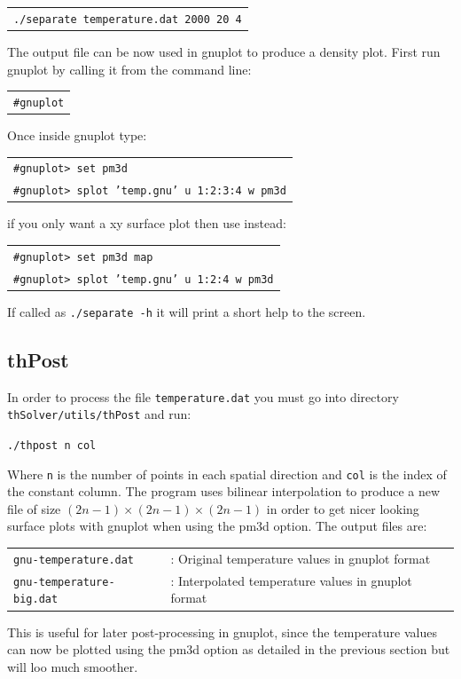\documentclass[12pt]{article}
\begin{document}
\begin{tabular}{l}
\texttt{./separate temperature.dat 2000 20 4}
\end{tabular}

The output file can be now used in gnuplot to produce a density plot. First run gnuplot by calling it from the command line:

\begin{tabular}{l}
\verb+#gnuplot+
\end{tabular}

Once inside gnuplot type:

\begin{tabular}{l}
\texttt{\#gnuplot> set pm3d}\\
\texttt{\#gnuplot> splot 'temp.gnu' u 1:2:3:4 w pm3d}
\end{tabular}

if you only want a xy surface plot then use instead:

\begin{tabular}{l}
\texttt{\#gnuplot> set pm3d map}\\
\texttt{\#gnuplot> splot 'temp.gnu' u 1:2:4 w pm3d}
\end{tabular}

If called as \verb+./separate -h+ it will print a short help to the screen.

\subsection{thPost}
In order to process the file \verb+temperature.dat+ you must go into directory \verb+thSolver/utils/thPost+ and run:

\texttt{./thpost n col}

Where \verb+n+ is the number of points in each spatial direction and \verb+col+ is the index of the constant column. The program uses bilinear interpolation to produce a new file of size $(2n-1)\times(2n-1)\times(2n-1)$ in order to get nicer looking surface plots with gnuplot when using the pm3d option. The output files are:

\begin{tabular}{ll}
\texttt{gnu-temperature.dat}&: Original temperature values in gnuplot format\\
\texttt{gnu-temperature-big.dat}&: Interpolated temperature values in gnuplot format\\
\end{tabular}

This is useful for later post-processing in gnuplot, since the temperature values can now be plotted using the pm3d option as detailed in the previous section but will loo much smoother.
\end{document}
